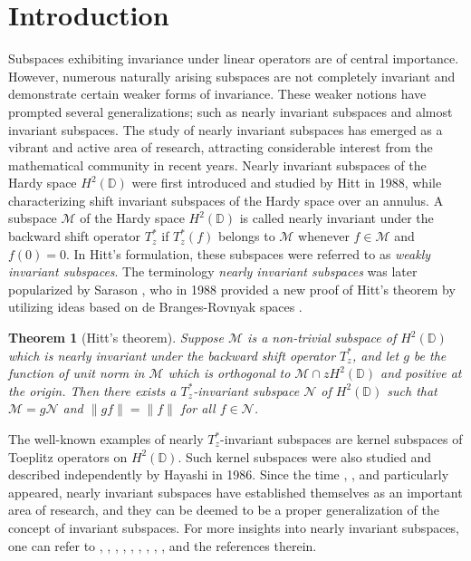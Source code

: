 \documentclass[11pt]{amsart}
\newtheorem{theorem}{Theorem}[section]
\numberwithin{equation}{section}
\newcommand{\bb}[1]{\mathbb{#1}}
\newcommand{\cl}[1]{\mathcal{#1}}
\begin{document}
\section{Introduction} \label{intro}
Subspaces exhibiting invariance under linear operators are of central importance. However, numerous naturally arising subspaces are not completely invariant and demonstrate certain weaker forms of invariance. These weaker notions have prompted several generalizations; such as nearly invariant subspaces and almost invariant subspaces. The study of nearly invariant subspaces has emerged as a vibrant and active area of research, attracting considerable interest from the mathematical community in recent years. Nearly invariant subspaces of the Hardy space $H^2(\mathbb{D})$ were first introduced and studied by Hitt \cite{Hit} in 1988, while characterizing shift invariant subspaces of the Hardy space over an annulus. A subspace $\cl M$ of the Hardy space $H^2(\bb D)$ is called nearly invariant under the backward shift operator $T^*_z$ if $T^*_z(f)$ belongs to 
$\cl M$ whenever $f\in \cl M$ and $f(0)=0$. In Hitt's formulation, these subspaces were referred to as \textit{weakly invariant subspaces}.  The terminology \textit{nearly invariant subspaces} was later popularized by Sarason  \cite{Sar}, who in 1988 provided a new proof of Hitt's theorem by utilizing ideas based on de Branges-Rovnyak spaces \cite{DBR}.


\begin{theorem}[Hitt's theorem] \cite[Theorem 1]{Sar} \label{ThH} Suppose $\mathcal{M}$ is a non-trivial subspace of $H^2(\mathbb{D})$ which is nearly invariant under the backward shift operator $T^*_z$, and let $g$ be the function of unit norm in $\mathcal{M}$ which is orthogonal to $\mathcal{M}\cap zH^2(\mathbb{D})$ and positive at the origin. Then there exists a $T^*_z$-invariant subspace $\mathcal{N}$ of $H^2(\mathbb{D})$ such that $\mathcal{M}=g\mathcal{N}$ and $\|gf\|=\|f\|$ for all $f \in \mathcal{N}$.
\end{theorem}

The well-known examples of nearly $T^*_z$-invariant subspaces are kernel subspaces of Toeplitz operators on $H^2(\mathbb{D})$. Such kernel subspaces were also studied and described independently by Hayashi \cite{Hay} in 1986. Since the time \cite{Hay}, \cite{Hit}, and particularly \cite{Sar} appeared, nearly invariant subspaces have established themselves as an important area of research, and they can be deemed to be a proper generalization of the concept of invariant subspaces. For more insights into 
nearly invariant subspaces, one can refer to \cite{CCP}, \cite{CGP1}, \cite{CD}, \cite{CDP1}, \cite{DS}, \cite{Era}, \cite{KLD}, \cite{KLS1}, \cite{LP}, and the references therein. 
\end{document}
